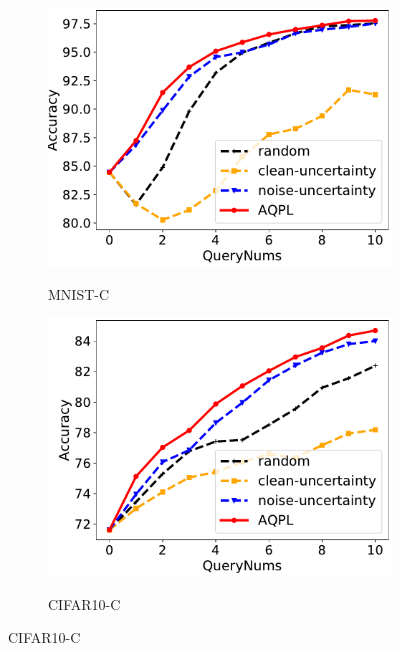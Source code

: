 \documentclass[letterpaper]{article} %
\begin{document}
\begin{figure}[!t]
	\centering

	\begin{subfigure}{0.3\linewidth}
		\centering
		\label{fig.Mnist.Gaussian}
		\includegraphics[width=1\textwidth]{img/Resnet18-Mnist-GuassianNoise.pdf}\\
		\caption{MNIST-C}
	\end{subfigure}
	\begin{subfigure}{0.3\linewidth}
		\centering
		\label{fig.Cifar10.Gaussian}
		\includegraphics[width=1\textwidth]{img/Resnet18-CIFAR10-GuassianNoise.pdf}\\
		\caption{CIFAR10-C}
	\end{subfigure}

\end{figure}
\end{document}
